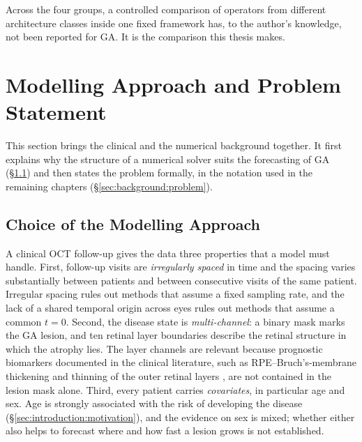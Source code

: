 Across the four groups, a controlled comparison of operators from
different architecture classes inside one fixed framework has, to the
author's knowledge, not been reported for GA. It is the comparison this
thesis makes.

\section{Modelling Approach and Problem Statement}
\label{sec:background:approach}

This section brings the clinical and the numerical background together.
It first explains why the structure of a numerical solver suits the
forecasting of GA (\S\ref{sec:introduction:why-pde}) and then states the
problem formally, in the notation used in the remaining chapters
(\S\ref{sec:background:problem}).


\subsection{Choice of the Modelling Approach}
\label{sec:introduction:why-pde}
\label{sec:background:pde-solvers:ga}

A clinical OCT follow-up gives the data three properties that a model must
handle. First, follow-up visits are
\emph{irregularly spaced} in time and the spacing varies substantially
between patients and between consecutive visits of the same patient.
Irregular spacing rules out methods that assume a fixed sampling rate, and
the lack of a shared temporal origin across eyes rules out methods that
assume a common $t = 0$. Second, the disease state is
\emph{multi-channel}: a binary mask marks the GA lesion, and ten retinal
layer boundaries describe the retinal structure in which the atrophy lies.
The layer channels are relevant because prognostic biomarkers
documented in the clinical literature, such as RPE--Bruch's-membrane
thickening \citep{Chu2022} and thinning of the outer retinal layers
\citep{Vallino2024}, are not contained in the lesion mask alone. Third, every patient carries \emph{covariates}, in particular age and
sex. Age is strongly associated with the risk of developing the disease
(\S\ref{sec:introduction:motivation}), and the evidence on sex is mixed;
whether either also helps to forecast where and how fast a lesion grows is
not established.


